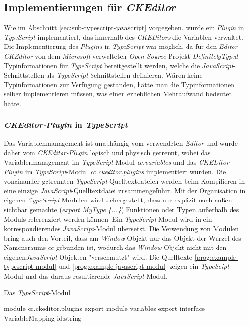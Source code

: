 \subsection{Implementierungen für \emph{CKEditor}}
Wie im Abschnitt \ref{sec:sub-typescript-javascript} vorgegeben, wurde ein \emph{Plugin} in \emph{TypeScript} implementiert, das innerhalb des \emph{CKEDitors} die Variablen verwaltet. Die Implementierung des \emph{Plugins} in \emph{TypeScript} war möglich, da für den \emph{Editor CKEditor} von dem \emph{Microsoft} verwalteten \emph{Open-Source}-Projekt \emph{DefinitelyTyped} Typinformationen für \emph{TypeScript} bereitgestellt werden, welche die \emph{JavaScript}-Schnittstellen als \emph{TypeScript}-Schnittstellen definieren. Wären keine Typinformationen zur Verfügung gestanden, hätte man die Typinformationen selber implementieren müssen, was einen erheblichen Mehraufwand bedeutet hätte.
 
\subsubsection{\emph{CKEditor-Plugin} in \emph{TypeScript}}
Das Variablenmanagement ist unabhängig vom verwendeten \emph{Editor} und wurde daher vom \emph{CKEditor-Plugin} logisch und physisch getrennt, wobei das Variablenmanagement im \emph{TypeScript}-Modul \emph{cc.variables} und das \emph{CKEDitor-Plugin} im \emph{TypeScript}-Modul \emph{cc.ckeditor.plugins} implementiert wurden. 
\newline
\newline
Die voneinander getrennten \emph{TypeScript}-Quelltextdateien werden beim Kompilieren in eine einzige \emph{JavaScript}-Quelltextdatei zusammengeführt. Mit der Organisation in eigenen \emph{TypeScript}-Modulen wird sichergestellt, dass nur explizit nach außen sichtbar gemachte (\emph{export MyType \{...\}}) Funktionen oder Typen außerhalb des Moduls referenziert werden können. Ein \emph{TypeScript}-Modul wird in ein korrespondierendes \emph{JavaScript}-Modul übersetzt. Die Verwendung von Modulen bring auch den Vorteil, dass am \emph{Window}-Objekt nur das Objekt der Wurzel des Namensraums \emph{cc} gebunden ist, wodurch das \emph{Window}-Objekt nicht mit den eigenen\emph{JavaScript}-Objekten "verschmutzt" wird. Die Quelltexte \ref{prog:example-typescript-modul} und \ref{prog:example-javascript-modul} zeigen ein \emph{TypeScipt}-Modul und das daraus resultierende \emph{JavaScript}-Modul.
\newpage

\begin{program}[h]
\caption{Das \emph{TypeScript}-Modul}
\label{prog:example-typescript-modul}
\begin{JsCode}[numbers=none]
module cc.ckeditor.plugins {
	export module variables {
		export interface VariableMapping {
	        id:string
		}
	}
}                  
\end{JsCode}
\end{program}

